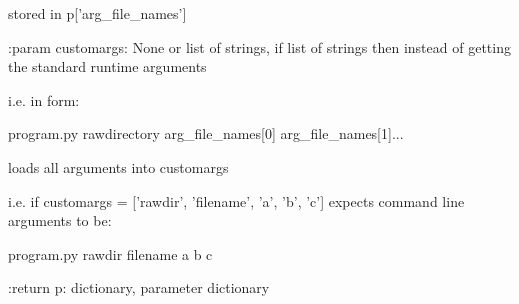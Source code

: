 \begin{minipage}{\textwidth}
\begin{pythondocstring}
              stored in p['arg_file_names']

:param customargs: None or list of strings, if list of strings then instead
                   of getting the standard runtime arguments

       i.e. in form:

            program.py rawdirectory arg_file_names[0] arg_file_names[1]...

       loads all arguments into customargs

       i.e. if customargs = ['rawdir', 'filename', 'a', 'b', 'c']
       expects command line arguments to be:

            program.py rawdir filename a b c

:return p: dictionary, parameter dictionary
\end{pythondocstring}
\end{minipage}


